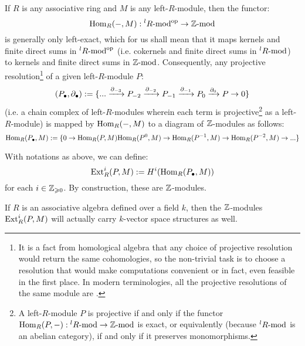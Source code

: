         If $R$ is any associative ring and $M$ is any left-$R$-module, then the functor:
            $$\Hom_R(-, M): {}^lR\mod^{\op} \to \Z\mod$$
        is generally only left-exact, which for us shall mean that it maps kernels and finite direct sums in ${}^lR\mod^{\op}$ (i.e. cokernels and finite direct sums in ${}^lR\mod$) to kernels and finite direct sums in $\Z\mod$. Consequently, any projective resolution\footnote{It is a fact from homological algebra that any choice of projective resolution would return the same cohomologies, so the non-trivial task is to choose a resolution that would make computations convenient or in fact, even feasible in the first place. In modern terminologies, all the projective resolutions of the same module are .} of a given left-$R$-module $P$:
            $$(P_{\bullet}, \del_{\bullet}) := \{ ... \xrightarrow[]{\del_{-3}} P_{-2} \xrightarrow[]{\del_{-2}} P_{-1} \xrightarrow[]{\del_{-1}} P_0 \xrightarrow[]{\del_0} P \to 0 \}$$
        (i.e. a chain complex of left-$R$-modules wherein each term is projective\footnote{A left-$R$-module $P$ is projective if and only if the functor $\Hom_R(P, -): {}^lR\mod \to \Z\mod$ is exact, or equivalently (because ${}^lR\mod$ is an abelian category), if and only if it preserves monomorphisms.} as a left-$R$-module) is mapped by $\Hom_R(-, M)$ to a diagram of $\Z$-modules as follows:
            $$\Hom_R(P_{\bullet}, M) := \{ 0 \to \Hom_R(P, M) \Hom_R(P^0, M) \to \Hom_R(P^{-1}, M) \to \Hom_R(P^{-2}, M) \to ... \}$$
        \begin{definition} \label{def: Ext_groups}
            With notations as above, we can define:
                $$\Ext^i_R(P, M) := H^i(\Hom_R(P_{\bullet}, M))$$
            for each $i \in \Z_{\geq 0}$. By construction, these are $\Z$-modules. 
        \end{definition}
        \begin{remark}
            If $R$ is an associative algebra defined over a field $k$, then the $\Z$-modules $\Ext^i_R(P, M)$ will actually carry $k$-vector space structures as well.
        \end{remark}
